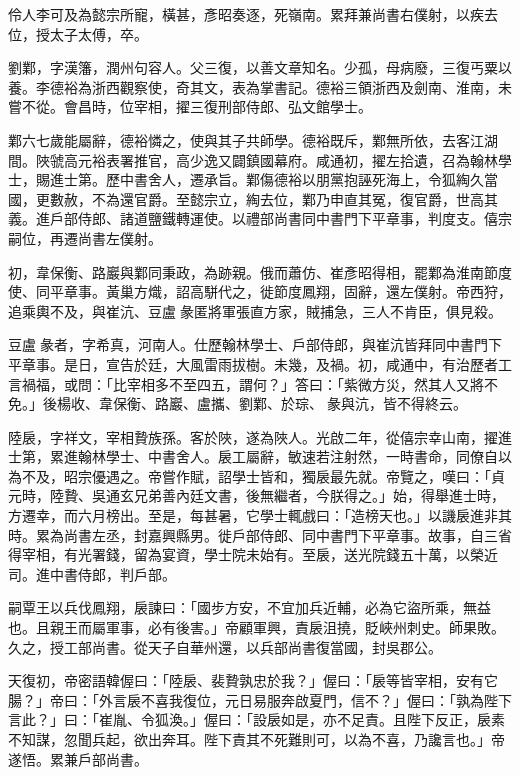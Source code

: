 \begin{pinyinscope}
 伶人李可及為懿宗所寵，橫甚，彥昭奏逐，死嶺南。累拜兼尚書右僕射，以疾去位，授太子太傅，卒。



 劉鄴，字漢籓，潤州句容人。父三復，以善文章知名。少孤，母病廢，三復丐粟以養。李德裕為浙西觀察使，奇其文，表為掌書記。德裕三領浙西及劍南、淮南，未嘗不從。會昌時，位宰相，擢三復刑部侍郎、弘文館學士。



 鄴六七歲能屬辭，德裕憐之，使與其子共師學。德裕既斥，鄴無所依，去客江湖間。陜虢高元裕表署推官，高少逸又闢鎮國幕府。咸通初，擢左拾遺，召為翰林學士，賜進士第。歷中書舍人，遷承旨。鄴傷德裕以朋黨抱誣死海上，令狐綯久當國，更數赦，不為還官爵。至懿宗立，綯去位，鄴乃申直其冤，復官爵，世高其義。進戶部侍郎、諸道鹽鐵轉運使。以禮部尚書同中書門下平章事，判度支。僖宗嗣位，再遷尚書左僕射。



 初，韋保衡、路巖與鄴同秉政，為跡親。俄而蕭仿、崔彥昭得相，罷鄴為淮南節度使、同平章事。黃巢方熾，詔高駢代之，徙節度鳳翔，固辭，還左僕射。帝西狩，追乘輿不及，與崔沆、豆盧彖匿將軍張直方家，賊捕急，三人不肯臣，俱見殺。



 豆盧彖者，字希真，河南人。仕歷翰林學士、戶部侍郎，與崔沆皆拜同中書門下平章事。是日，宣告於廷，大風雷雨拔樹。未幾，及禍。初，咸通中，有治歷者工言禍福，或問：「比宰相多不至四五，謂何？」答曰：「紫微方災，然其人又將不免。」後楊收、韋保衡、路巖、盧攜、劉鄴、於琮、彖與沆，皆不得終云。



 陸扆，字祥文，宰相贄族孫。客於陜，遂為陜人。光啟二年，從僖宗幸山南，擢進士第，累進翰林學士、中書舍人。扆工屬辭，敏速若注射然，一時書命，同僚自以為不及，昭宗優遇之。帝嘗作賦，詔學士皆和，獨扆最先就。帝覽之，嘆曰：「貞元時，陸贄、吳通玄兄弟善內廷文書，後無繼者，今朕得之。」始，得舉進士時，方遷幸，而六月榜出。至是，每甚暑，它學士輒戲曰：「造榜天也。」以譏扆進非其時。累為尚書左丞，封嘉興縣男。徙戶部侍郎、同中書門下平章事。故事，自三省得宰相，有光署錢，留為宴資，學士院未始有。至扆，送光院錢五十萬，以榮近司。進中書侍郎，判戶部。



 嗣覃王以兵伐鳳翔，扆諫曰：「國步方安，不宜加兵近輔，必為它盜所乘，無益也。且親王而屬軍事，必有後害。」帝顧軍興，責扆沮撓，貶峽州刺史。師果敗。久之，授工部尚書。從天子自華州還，以兵部尚書復當國，封吳郡公。



 天復初，帝密語韓偓曰：「陸扆、裴贄孰忠於我？」偓曰：「扆等皆宰相，安有它腸？」帝曰：「外言扆不喜我復位，元日易服奔啟夏門，信不？」偓曰：「孰為陛下言此？」曰：「崔胤、令狐渙。」偓曰：「設扆如是，亦不足責。且陛下反正，扆素不知謀，忽聞兵起，欲出奔耳。陛下責其不死難則可，以為不喜，乃讒言也。」帝遂悟。累兼戶部尚書。




\end{pinyinscope}
